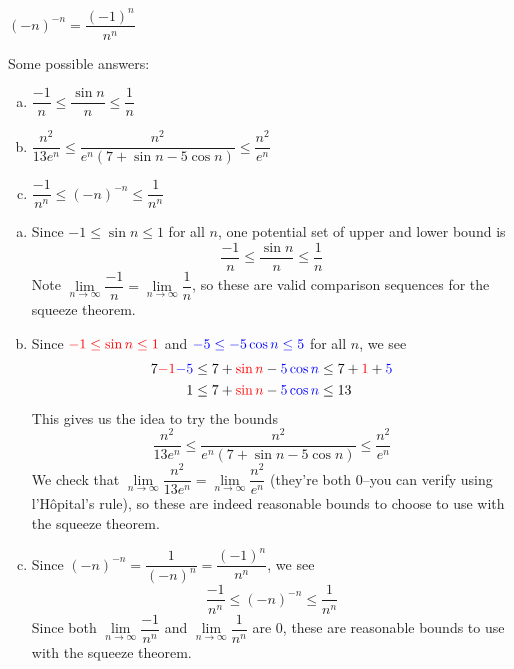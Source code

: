 \begin{hint}
$(-n)^{-n} = \dfrac{(-1)^n}{n^n}$
\end{hint}
\begin{answer}
Some possible answers:
\begin{enumerate}[(a)]
\item $\dfrac{-1}{n}\le \dfrac{\sin n}{n}\le \dfrac{1}{n}$
\item $\dfrac{n^2}{13e^n} \le \dfrac{n^2}{e^n(7+\sin n - 5\cos n)} \le \dfrac{n^2}{e^n}$
\item $ \dfrac{-1}{n^n} \le (-n)^{-n} \le \dfrac{1}{n^n}$
\end{enumerate}
\end{answer}
\begin{solution}
\begin{enumerate}[(a)]
\item Since $-1 \leq \sin n \leq 1$ for all $n$, one potential set of upper and lower bound is
\[\dfrac{-1}{n}\le \dfrac{\sin n}{n}\le \dfrac{1}{n}\]
Note $\lim\limits_{n \to \infty}\dfrac{-1}{n} = \lim\limits_{n \to \infty}\dfrac{1}{n}$, so these are valid comparison sequences for the squeeze theorem.
\item Since $\textcolor{red}{-1\leq \sin n \leq 1}$ and $\textcolor{blue}{-5 \leq -5\cos n \leq 5}$ for all $n$, we see
\begin{align*}
7\textcolor{red}{-1}\textcolor{blue}{-5}&\leq 7+\textcolor{red}{\sin n} -\textcolor{blue}{ 5 \cos n} \leq 7+\textcolor{red}1+\textcolor{blue}5\\
1&\leq 7+\textcolor{red}{\sin n} -\textcolor{blue}{ 5 \cos n} \leq13
\end{align*}
This gives us the idea to try the bounds
\[\dfrac{n^2}{13e^n} \le \dfrac{n^2}{e^n(7+\sin n - 5\cos n)} \le \dfrac{n^2}{e^n}\]
We check that $\lim\limits_{n \to \infty}\dfrac{n^2}{13e^n}  = \lim\limits_{n \to \infty}\dfrac{n^2}{e^n} $ (they're both 0--you can verify using l'H\^{o}pital's rule), so these are indeed reasonable bounds to choose to use with the squeeze theorem.
\item Since $(-n)^{-n} = \dfrac{1}{(-n)^n} = \dfrac{(-1)^n}{n^n}$, we see
\[ \dfrac{-1}{n^n} \le (-n)^{-n} \le \dfrac{1}{n^n}\]
Since both $\lim\limits_{n \to \infty}\dfrac{-1}{n^n} $  and $\lim\limits_{n \to \infty}\dfrac{1}{n^n} $  are 0, these are reasonable bounds to use with the squeeze theorem.
\end{enumerate}

\end{solution}
